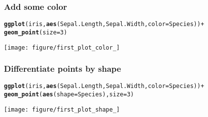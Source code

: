 \documentclass{beamer}\usepackage[]{graphicx}\usepackage[]{color}
\makeatletter
\newcommand{\hlkwd}[1]{\textcolor[rgb]{0.737,0.353,0.396}{\textbf{#1}}}%
\newenvironment{kframe}{%
 \def\at@end@of@kframe{}%
 \ifinner\ifhmode%
  \def\at@end@of@kframe{\end{minipage}}%
  \begin{minipage}{\columnwidth}%
 \fi\fi%
 \def\FrameCommand##1{\hskip\@totalleftmargin \hskip-\fboxsep
 \colorbox{shadecolor}{##1}\hskip-\fboxsep
     \hskip-\linewidth \hskip-\@totalleftmargin \hskip\columnwidth}%
 \MakeFramed {\advance\hsize-\width
   \@totalleftmargin\z@ \linewidth\hsize
   \@setminipage}}%
 {\par\unskip\endMakeFramed%
 \at@end@of@kframe}
\newenvironment{knitrout}{}{} %
\makeatother
\begin{document}
\begin{frame}[fragile]
\frametitle{Add some color}
\begin{knitrout}\footnotesize
{}\color{fgcolor}\begin{kframe}
\begin{alltt}
\hlkwd{ggplot}(iris, \hlkwd{aes}(Sepal.Length, Sepal.Width, color = Species)) +
\hlkwd{geom_point}(size = 3)
\end{alltt}
\end{kframe}

{\centering \texttt{[image: figure/first\_plot\_color\_]} 

}



\end{knitrout}

\end{frame}

\begin{frame}[fragile]
\frametitle{Differentiate points by shape}
\begin{knitrout}\footnotesize
{}\color{fgcolor}\begin{kframe}
\begin{alltt}
\hlkwd{ggplot}(iris, \hlkwd{aes}(Sepal.Length, Sepal.Width, color = Species)) +
\hlkwd{geom_point}(\hlkwd{aes}(shape = Species), size = 3)
\end{alltt}
\end{kframe}

{\centering \texttt{[image: figure/first\_plot\_shape\_]} 

}



\end{knitrout}

\end{frame}
\end{document}
